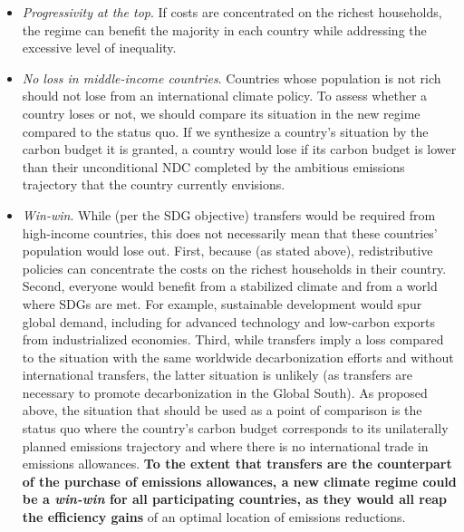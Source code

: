 \documentclass[12pt,english]{article}
\begin{document}
\begin{itemize}
  \begin{itemize}
    \item \textit{Progressivity at the top}. If costs are concentrated on the richest households, the regime can benefit the majority in each country while addressing the excessive level of inequality.
    \item \textit{No loss in middle-income countries}. Countries whose population is not rich should not lose from an international climate policy. To assess whether a country loses or not, we should compare its situation in the new regime compared to the status quo. If we synthesize a country's situation by the carbon budget it is granted, a country would lose if its carbon budget is lower than their unconditional NDC completed by the ambitious emissions trajectory that the country currently envisions. %
    \item \textit{Win-win}. While (per the SDG objective) transfers would be required from high-income countries, this does not necessarily mean that these countries' population would lose out. First, because (as stated above), redistributive policies can concentrate the costs on the richest households in their country. Second, everyone would benefit from a stabilized climate and from a world where SDGs are met. For example, sustainable development would spur global demand, including for advanced technology and low-carbon exports from industrialized economies. Third, while transfers imply a loss compared to the situation with the same worldwide decarbonization efforts and without international transfers, the latter situation is unlikely (as transfers are necessary to promote decarbonization in the Global South). As proposed above, the situation that should be used as a point of comparison is the status quo where the country's carbon budget corresponds to its unilaterally planned emissions trajectory and where there is no international trade in emissions allowances. \textbf{To the extent that transfers are the counterpart of the purchase of emissions allowances, a new climate regime could be a \textit{win-win} for all participating countries, as they would all reap the efficiency gains} of an optimal location of emissions reductions.
  \end{itemize}
\end{itemize}
\end{document}
